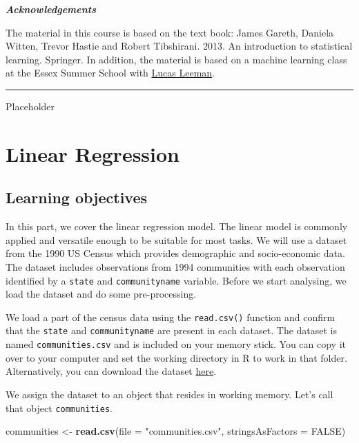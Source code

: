 \documentclass[]{article}
\newenvironment{Shaded}{\begin{snugshade}}{\end{snugshade}}
\newcommand{\DataTypeTok}[1]{\textcolor[rgb]{0.13,0.29,0.53}{#1}}
\newcommand{\KeywordTok}[1]{\textcolor[rgb]{0.13,0.29,0.53}{\textbf{#1}}}
\newcommand{\NormalTok}[1]{#1}
\newcommand{\OtherTok}[1]{\textcolor[rgb]{0.56,0.35,0.01}{#1}}
\newcommand{\StringTok}[1]{\textcolor[rgb]{0.31,0.60,0.02}{#1}}
\begin{document}
\textbf{\emph{Acknowledgements}}

The material in this course is based on the text book: James Gareth, Daniela Witten, Trevor Hastie and Robert Tibshirani. 2013. An introduction to statistical learning. Springer. In addition, the material is based on a machine learning class at the Essex Summer School with \href{https://lucasleemann.ch}{Lucas Leeman}.

\begin{center}\rule{0.5\linewidth}{\linethickness}\end{center}

Placeholder

\hypertarget{linear-regression}{%
\section{Linear Regression}\label{linear-regression}}

\hypertarget{learning-objectives}{%
\subsection{Learning objectives}\label{learning-objectives}}

In this part, we cover the linear regression model. The linear model is commonly applied and versatile enough to be suitable for most tasks. We will use a dataset from the 1990 US Census which provides demographic and socio-economic data. The dataset includes observations from 1994 communities with each observation identified by a \texttt{state} and \texttt{communityname} variable. Before we start analysing, we load the dataset and do some pre-processing.

We load a part of the census data using the \texttt{read.csv()} function and confirm that the \texttt{state} and \texttt{communityname} are present in each dataset. The dataset is named \texttt{communities.csv} and is included on your memory stick. You can copy it over to your computer and set the working directory in R to work in that folder. Alternatively, you can download the dataset \href{http://philippbroniecki.github.io/ML2017.io/data/communities.csv}{here}.

We assign the dataset to an object that resides in working memory. Let's call that object \texttt{communities}.

\begin{Shaded}
\begin{Highlighting}[]
\NormalTok{communities <-}\StringTok{ }\KeywordTok{read.csv}\NormalTok{(}\DataTypeTok{file =} \StringTok{"communities.csv"}\NormalTok{, }\DataTypeTok{stringsAsFactors =} \OtherTok{FALSE}\NormalTok{)}
\end{Highlighting}
\end{Shaded}
\end{document}

